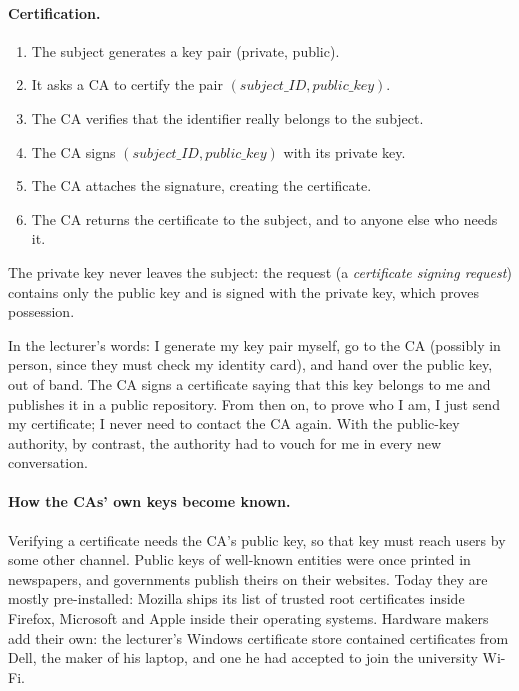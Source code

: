 \paragraph{Certification.}
\begin{enumerate}
    \item The subject generates a key pair (private, public).
    \item It asks a CA to certify the pair $(\mathit{subject\_ID}, \mathit{public\_key})$.
    \item The CA verifies that the identifier really belongs to the subject.
    \item The CA signs $(\mathit{subject\_ID}, \mathit{public\_key})$ with its private key.
    \item The CA attaches the signature, creating the certificate.
    \item The CA returns the certificate to the subject, and to anyone else who needs it.
\end{enumerate}
The private key never leaves the subject: the request (a \emph{certificate signing request}) contains only the public key and is signed with the private key, which proves possession.

In the lecturer's words: I generate my key pair myself, go to the CA (possibly in person, since they must check my identity card), and hand over the public key, out of band. The CA signs a certificate saying that this key belongs to me and publishes it in a public repository. From then on, to prove who I am, I just send my certificate; I never need to contact the CA again. With the public-key authority, by contrast, the authority had to vouch for me in every new conversation.

\paragraph{How the CAs' own keys become known.} Verifying a certificate needs the CA's public key, so that key must reach users by some other channel. Public keys of well-known entities were once printed in newspapers, and governments publish theirs on their websites. Today they are mostly pre-installed: Mozilla ships its list of trusted root certificates inside Firefox, Microsoft and Apple inside their operating systems. Hardware makers add their own: the lecturer's Windows certificate store contained certificates from Dell, the maker of his laptop, and one he had accepted to join the university Wi-Fi.

